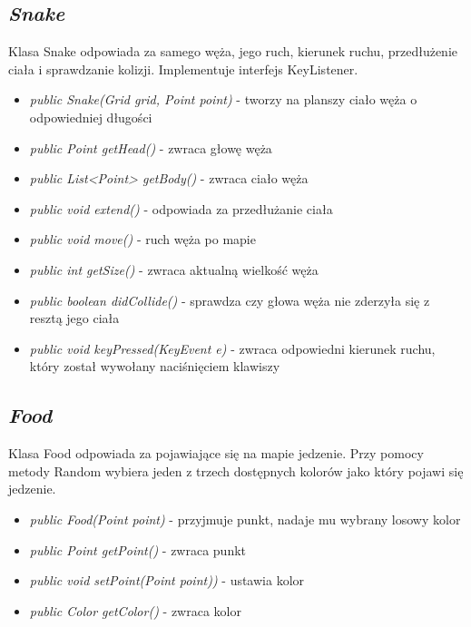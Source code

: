 \documentclass[12pt]{article}
\begin{document}
\subsection{\textbf{\textit{Snake}}}

Klasa Snake odpowiada za samego węża, jego ruch, kierunek ruchu, przedłużenie ciała i sprawdzanie kolizji. Implementuje interfejs KeyListener.
\begin{itemize}
	\item \textit{public Snake(Grid grid, Point point)} - tworzy na planszy ciało węża o odpowiedniej długości
	\item \textit{public Point getHead()} - zwraca głowę węża
	\item \textit{public List<Point> getBody()} - zwraca ciało węża
	\item \textit{public void extend()} - odpowiada za przedłużanie ciała
	\item \textit{public void move()} - ruch węża po mapie
	\item \textit{public int getSize()} - zwraca aktualną wielkość węża
	\item \textit{public boolean didCollide()} - sprawdza czy głowa węża nie zderzyła się z resztą jego ciała
	\item \textit{public void keyPressed(KeyEvent e)} - zwraca odpowiedni kierunek ruchu, który został wywołany naciśnięciem klawiszy
	\end{itemize}

\subsection{\textbf{\textit{Food}}}

Klasa Food odpowiada za pojawiające się na mapie jedzenie. Przy pomocy metody Random wybiera jeden z trzech dostępnych kolorów jako który pojawi się jedzenie.

\begin{itemize}
            \item \textit{public Food(Point point)} - przyjmuje punkt, nadaje mu wybrany losowy kolor
            \item \textit{public Point getPoint()} - zwraca punkt
            \item \textit{public void setPoint(Point point))} - ustawia kolor
            \item \textit{public Color getColor()} - zwraca kolor
\end{itemize}
\end{document}
